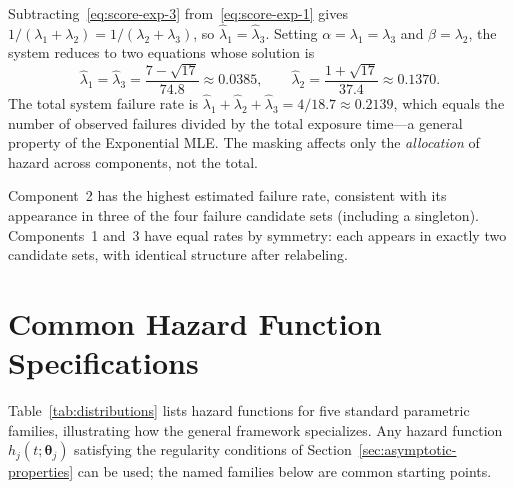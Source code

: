 \documentclass[11pt]{article}
\theoremstyle{definition}
\theoremstyle{plain}
\renewcommand{\v}[1]{\boldsymbol{#1}}
\begin{document}
Subtracting~\eqref{eq:score-exp-3} from~\eqref{eq:score-exp-1} gives
$1/(\lambda_1 + \lambda_2) = 1/(\lambda_2 + \lambda_3)$, so
$\hat\lambda_1 = \hat\lambda_3$.
Setting $\alpha = \lambda_1 = \lambda_3$ and $\beta = \lambda_2$,
the system reduces to two equations whose solution is
\begin{equation}
    \hat\lambda_1 = \hat\lambda_3
    = \frac{7 - \sqrt{17}}{74.8} \approx 0.0385, \qquad
    \hat\lambda_2
    = \frac{1 + \sqrt{17}}{37.4} \approx 0.1370.
\end{equation}
The total system failure rate is
$\hat\lambda_1 + \hat\lambda_2 + \hat\lambda_3 = 4/18.7 \approx 0.2139$,
which equals the number of observed failures divided by the total
exposure time---a general property of the Exponential MLE.
The masking affects only the \emph{allocation} of hazard across
components, not the total.

Component~2 has the highest estimated failure rate, consistent with
its appearance in three of the four failure candidate sets (including
a singleton).
Components~1 and~3 have equal rates by symmetry: each appears in
exactly two candidate sets, with identical structure after relabeling.


\section{Common Hazard Function Specifications}
\label{sec:families}

Table~\ref{tab:distributions} lists hazard functions for five standard
parametric families, illustrating how the general framework specializes.
Any hazard function $h_j(t; \v{\theta}_j)$ satisfying the regularity
conditions of Section~\ref{sec:asymptotic-properties} can be used; the
named families below are common starting points.
\end{document}

